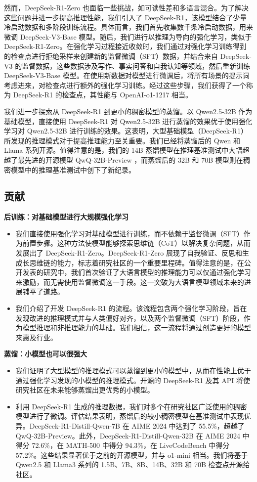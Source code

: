 \documentclass[lang=cn,a4paper,newtx]{elegantpaper}
\newcommand{\dsri}{DeepSeek-R1}
\newcommand{\dsro}{DeepSeek-R1-Zero}
\begin{document}
然而，\dsro{} 也面临一些挑战，如可读性差和多语言混合。为了解决这些问题并进一步提高推理性能，我们引入了 \dsri{}，该模型结合了少量冷启动数据和多阶段训练流程。具体而言，我们首先收集数千条冷启动数据，用来微调 DeepSeek-V3-Base 模型。随后，我们进行以推理为导向的强化学习，类似于 \dsro{}。在强化学习过程接近收敛时，我们通过对强化学习训练得到的检查点进行拒绝采样来创建新的监督微调（SFT）数据，并结合来自 DeepSeek-V3 的监督数据，这些数据涉及写作、事实问答和自我认知等领域，然后重新训练 DeepSeek-V3-Base 模型。在使用新数据对模型进行微调后，将所有场景的提示词考虑进来，对检查点进行额外的强化学习训练。经过这些步骤，我们获得了一个称为 \dsri{} 的检查点，其性能与 OpenAI-o1-1217 相当。

我们进一步探索从 \dsri{} 到更小的稠密模型的蒸馏。以 Qwen2.5-32B 作为基础模型，直接使用 DeepSeek-R1 对 Qwen2.5-32B 进行蒸馏的效果优于使用强化学习对 Qwen2.5-32B 进行训练的效果。这表明，大型基础模型（\dsri{}）所发现的推理模式对于提高推理能力至关重要。我们已经将蒸馏后的 Qwen 和 Llama 系列开源。值得注意的是，我们的 14B 蒸馏模型在推理基准测试中大幅超越了最先进的开源模型 QwQ-32B-Preview ，而蒸馏后的 32B 和 70B 模型则在稠密模型中的推理基准测试中创下了新纪录。

\subsection{贡献}

\textbf{后训练：对基础模型进行大规模强化学习}

\begin{itemize}
  \item 我们直接使用强化学习对基础模型进行训练，而不依赖于监督微调（SFT）作为前置步骤。这种方法使模型能够探索思维链（CoT）以解决复杂问题，从而发展出了 \dsro{}。\dsro{} 展现了自我验证、反思和生成长思维链的能力，标志着研究社区的一个重要里程碑。值得注意的是，在公开发表的研究中，我们首次验证了大语言模型的推理能力可以仅通过强化学习来激励，而无需使用监督微调这一手段。这一突破为大语言模型领域未来的进展铺平了道路。
  \item 我们介绍了开发 \dsri{} 的流程。该流程包含两个强化学习阶段，旨在发现改进的推理模式并与人类偏好对齐，以及两个监督微调（SFT）阶段，作为模型推理和非推理能力的基础。我们相信，这一流程将通过创造更好的模型来惠及行业。
\end{itemize}

\textbf{蒸馏：小模型也可以很强大}

\begin{itemize}
  \item 我们证明了大型模型的推理模式可以蒸馏到更小的模型中，从而在性能上优于通过强化学习发现的小模型的推理模式。开源的 \dsri{} 及其 API 将使研究社区在未来能够蒸馏出更优秀的小模型。
  \item 利用 \dsri{} 生成的推理数据，我们对多个在研究社区广泛使用的稠密模型进行了微调。评估结果表明，蒸馏后的较小稠密模型在基准测试中表现优异。DeepSeek-R1-Distill-Qwen-7B 在 AIME 2024 中达到了 55.5\%，超越了 QwQ-32B-Preview。此外，DeepSeek-R1-Distill-Qwen-32B 在 AIME 2024 中得分 72.6\%，在 MATH-500 中得分 94.3\%，在 LiveCodeBench 中得分 57.2\%。这些结果显著优于之前的开源模型，并与 o1-mini 相当。我们将基于 Qwen2.5 和 Llama3 系列的 1.5B、7B、8B、14B、32B 和 70B 检查点开源给社区。
\end{itemize}
\end{document}

